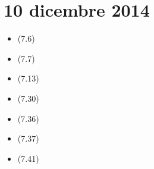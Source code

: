 \section{10 dicembre 2014}

\begin{itemize}
    \item (7.6)
    \item (7.7)
    \item (7.13)
    \item (7.30)
    \item (7.36)
    \item (7.37)
    \item (7.41)
\end{itemize}